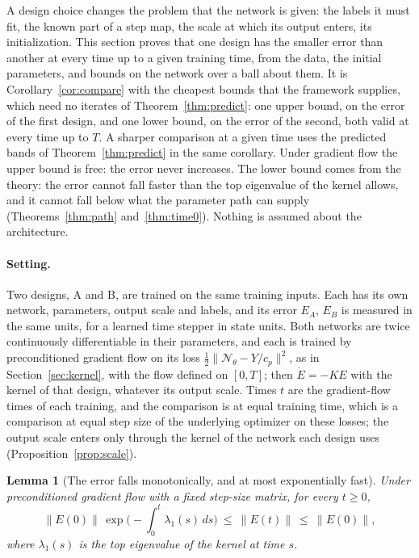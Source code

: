 \documentclass[11pt]{article}
\newtheorem{lemma}{Lemma}
\theoremstyle{definition}
\theoremstyle{remark}
\newcommand{\Net}{\mathcal{N}_\theta}    %
\begin{document}
A design choice changes the problem that the network is given: the labels it must fit, the known part of a step map, the scale at which its output enters, its initialization.
This section proves that one design has the smaller error than another at every time up to a given training time, from the data, the initial parameters, and bounds on the network over a ball about them.
It is Corollary~\ref{cor:compare} with the cheapest bounds that the framework supplies, which need no iterates of Theorem~\ref{thm:predict}: one upper bound, on the error of the first design, and one lower bound, on the error of the second, both valid at every time up to $T$.
A sharper comparison at a given time uses the predicted bands of Theorem~\ref{thm:predict} in the same corollary.
Under gradient flow the upper bound is free: the error never increases.
The lower bound comes from the theory: the error cannot fall faster than the top eigenvalue of the kernel allows, and it cannot fall below what the parameter path can supply (Theorems~\ref{thm:path} and~\ref{thm:time0}).
Nothing is assumed about the architecture.

\paragraph{Setting.}
Two designs, A and B, are trained on the same training inputs.
Each has its own network, parameters, output scale and labels, and its error $E_A$, $E_B$ is measured in the same units, for a learned time stepper in state units.
Both networks are twice continuously differentiable in their parameters, and each is trained by preconditioned gradient flow on its loss $\frac12\|\Net - Y/c_p\|^2$, as in Section~\ref{sec:kernel}, with the flow defined on $[0,T]$; then $\dot E = -KE$ with the kernel of that design, whatever its output scale.
Times $t$ are the gradient-flow times of each training, and the comparison is at equal training time, which is a comparison at equal step size of the underlying optimizer on these losses; the output scale enters only through the kernel of the network each design uses (Proposition~\ref{prop:scale}).

\begin{lemma}[The error falls monotonically, and at most exponentially fast]\label{lem:monoexp}
Under preconditioned gradient flow with a fixed step-size matrix, for every $t\ge0$,
\begin{equation}\label{eq:monoexp}
\|E(0)\|\,\exp\Big(-\int_0^t\lambda_1(s)\,ds\Big)\ \le\ \|E(t)\|\ \le\ \|E(0)\| ,
\end{equation}
where $\lambda_1(s)$ is the top eigenvalue of the kernel at time $s$.
\end{lemma}
\end{document}
